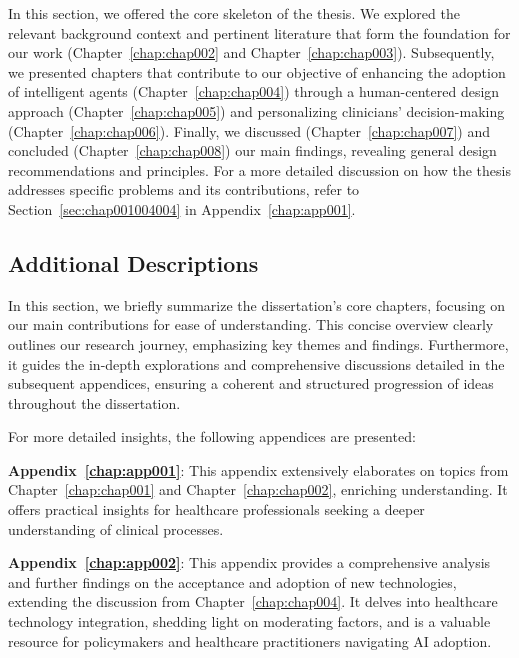 In this section, we offered the core skeleton of the thesis.
We explored the relevant background context and pertinent literature that form the foundation for our work (Chapter~\ref{chap:chap002} and Chapter~\ref{chap:chap003}).
Subsequently, we presented chapters that contribute to our objective of enhancing the adoption of intelligent agents (Chapter~\ref{chap:chap004}) through a human-centered design approach (Chapter~\ref{chap:chap005}) and personalizing clinicians' decision-making (Chapter~\ref{chap:chap006}).
Finally, we discussed (Chapter~\ref{chap:chap007}) and concluded (Chapter~\ref{chap:chap008}) our main findings, revealing general design recommendations and principles.
For a more detailed discussion on how the thesis addresses specific problems and its contributions, refer to Section~\ref{sec:chap001004004} in Appendix~\ref{chap:app001}.

\subsection{Additional Descriptions}
\label{sec:chap001004002}

In this section, we briefly summarize the dissertation's core chapters, focusing on our main contributions for ease of understanding.
This concise overview clearly outlines our research journey, emphasizing key themes and findings.
Furthermore, it guides the in-depth explorations and comprehensive discussions detailed in the subsequent appendices, ensuring a coherent and structured progression of ideas throughout the dissertation.

\vspace{2.00mm}

\noindent
For more detailed insights, the following appendices are presented:

\vspace{2.00mm}

\noindent
{\bf Appendix~\ref{chap:app001}}:
This appendix extensively elaborates on topics from Chapter~\ref{chap:chap001} and Chapter~\ref{chap:chap002}, enriching understanding.
It offers practical insights for healthcare professionals seeking a deeper understanding of clinical processes.

\vspace{2.00mm}

\noindent
{\bf Appendix~\ref{chap:app002}}:
This appendix provides a comprehensive analysis and further findings on the acceptance and adoption of new technologies, extending the discussion from Chapter~\ref{chap:chap004}.
It delves into healthcare technology integration, shedding light on moderating factors, and is a valuable resource for policymakers and healthcare practitioners navigating \ac{AI} adoption.

